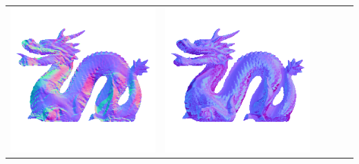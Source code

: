 \begin{center}
\begin{tabularx}{\linewidth}{@{}Y@{}Y@{}Y@{}Y@{}Y@{}Y@{}}
\includegraphics[width=\linewidth]{semisynthetic/20160617_21_yu_out.png} &
\includegraphics[width=\linewidth]{semisynthetic/20160617_21_dpsn_out.png} &

\end{tabularx}
\end{center}
